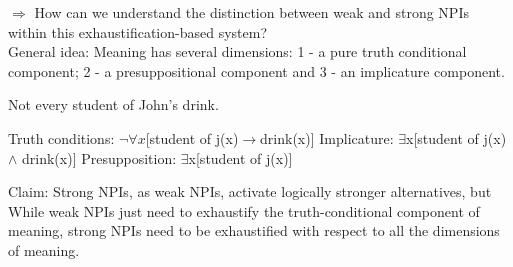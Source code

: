 \documentclass[a4paper,11pt]{article}
\begin{document}
$\Rightarrow$ How can we understand the distinction between weak and strong NPIs within this exhaustification-based  system?
\\General idea: Meaning has several dimensions: 1 - a pure truth conditional component; 2 - a presuppositional component and 3 - an implicature component.
\begin{exe}
\ex\label{mean} \begin{xlist}
\ex\label{mean1} Not every student of John's drink.
\ex\label{mean2} \begin{xlist}
\ex\label{mean2a} Truth conditions: $\neg\forall x$[student of j(x)$\rightarrow$drink(x)]
\ex\label{mean2b} Implicature: $\exists$x[student of j(x) $\wedge$ drink(x)]
\ex\label{mean2c} Presupposition: $\exists$x[student of j(x)]
\end{xlist}
\end{xlist}
\end{exe}
Claim: Strong NPIs, as weak NPIs, activate logically stronger alternatives, but While weak NPIs just need to exhaustify the truth-conditional component of meaning, strong NPIs need to be exhaustified with respect to all the dimensions of meaning.
\end{document}

